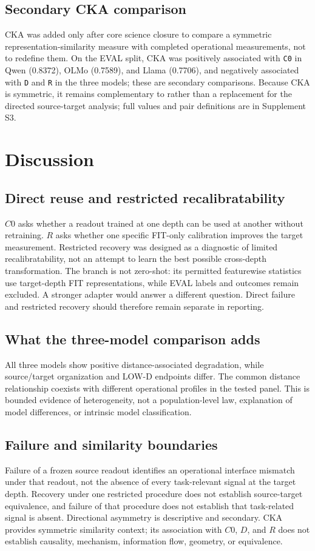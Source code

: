 \documentclass{article}
\begin{document}
\subsection{Secondary CKA comparison}
CKA was added only after core science closure to compare a symmetric representation-similarity measure with completed operational measurements, not to redefine them. On the EVAL split, CKA was positively associated with \texttt{C0} in Qwen (0.8372), OLMo (0.7589), and Llama (0.7706), and negatively associated with \texttt{D} and \texttt{R} in the three models; these are secondary comparisons. Because CKA is symmetric, it remains complementary to rather than a replacement for the directed source-target analysis; full values and pair definitions are in Supplement S3.

\section{Discussion}
\subsection{Direct reuse and restricted recalibratability}
$C0$ asks whether a readout trained at one depth can be used at another without retraining. $R$ asks whether one specific FIT-only calibration improves the target measurement. Restricted recovery was designed as a diagnostic of limited recalibratability, not an attempt to learn the best possible cross-depth transformation. The branch is not zero-shot: its permitted featurewise statistics use target-depth FIT representations, while EVAL labels and outcomes remain excluded. A stronger adapter would answer a different question. Direct failure and restricted recovery should therefore remain separate in reporting.

\subsection{What the three-model comparison adds}
All three models show positive distance-associated degradation, while source/target organization and LOW-D endpoints differ. The common distance relationship coexists with different operational profiles in the tested panel. This is bounded evidence of heterogeneity, not a population-level law, explanation of model differences, or intrinsic model classification.

\subsection{Failure and similarity boundaries}
Failure of a frozen source readout identifies an operational interface mismatch under that readout, not the absence of every task-relevant signal at the target depth. Recovery under one restricted procedure does not establish source-target equivalence, and failure of that procedure does not establish that task-related signal is absent. Directional asymmetry is descriptive and secondary. CKA provides symmetric similarity context; its association with $C0$, $D$, and $R$ does not establish causality, mechanism, information flow, geometry, or equivalence.
\end{document}
